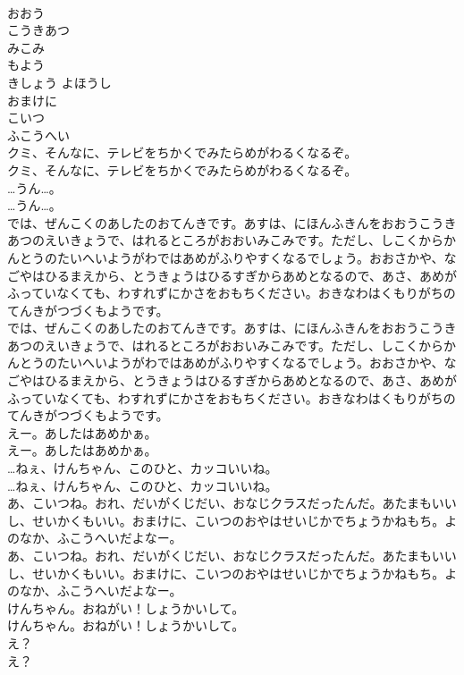 \documentclass[8pt]{extreport}
\begin{document}
\begin{CJK}{UTF8}{min}
\\	おおう
\\	こうきあつ
\\	みこみ
\\	もよう
\\	きしょう よほうし
\\	おまけに
\\	こいつ
\\	ふこうへい
\\	クミ、そんなに、テレビをちかくでみたらめがわるくなるぞ。	
\\	クミ、そんなに、テレビをちかくでみたらめがわるくなるぞ。 
\\	…うん…。	
\\	…うん…。 
\\	では、ぜんこくのあしたのおてんきです。あすは、にほんふきんをおおうこうきあつのえいきょうで、はれるところがおおいみこみです。ただし、しこくからかんとうのたいへいようがわではあめがふりやすくなるでしょう。おおさかや、なごやはひるまえから、とうきょうはひるすぎからあめとなるので、あさ、あめがふっていなくても、わすれずにかさをおもちください。おきなわはくもりがちのてんきがつづくもようです。	
\\	では、ぜんこくのあしたのおてんきです。あすは、にほんふきんをおおうこうきあつのえいきょうで、はれるところがおおいみこみです。ただし、しこくからかんとうのたいへいようがわではあめがふりやすくなるでしょう。おおさかや、なごやはひるまえから、とうきょうはひるすぎからあめとなるので、あさ、あめがふっていなくても、わすれずにかさをおもちください。おきなわはくもりがちのてんきがつづくもようです。 
\\	えー。あしたはあめかぁ。	
\\	えー。あしたはあめかぁ。 
\\	…ねぇ、けんちゃん、このひと、カッコいいね。	
\\	…ねぇ、けんちゃん、このひと、カッコいいね。 
\\	あ、こいつね。おれ、だいがくじだい、おなじクラスだったんだ。あたまもいいし、せいかくもいい。おまけに、こいつのおやはせいじかでちょうかねもち。よのなか、ふこうへいだよなー。	
\\	あ、こいつね。おれ、だいがくじだい、おなじクラスだったんだ。あたまもいいし、せいかくもいい。おまけに、こいつのおやはせいじかでちょうかねもち。よのなか、ふこうへいだよなー。 
\\	けんちゃん。おねがい！しょうかいして。	
\\	けんちゃん。おねがい！しょうかいして。 
\\	え？	
\\	え？ 

\end{CJK}
\end{document}
